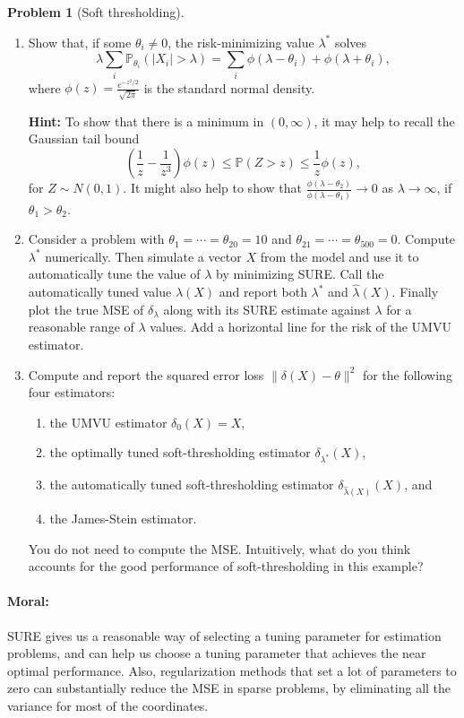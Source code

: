 \documentclass{article}
\newcommand{\PP}{\mathbb{P}}
\theoremstyle{definition}
\newtheorem{problem}{Problem}
\begin{document}
\begin{problem}[Soft thresholding]
\begin{enumerate}[label=(\alph*)]
\item Show that, if some $\theta_i \neq 0$, the risk-minimizing value $\lambda^*$ solves
\[
\lambda \sum_i \PP_{\theta_i}(|X_i| > \lambda) = \sum_i \phi(\lambda - \theta_i) + \phi(\lambda + \theta_i),
\]
where $\phi(z) = \frac{e^{-z^2/2}}{\sqrt{2\pi}}$ is the standard normal density.

{\bf Hint:} To show that there is a minimum in $(0,\infty)$, it may help to recall the Gaussian tail bound
\[
\left(\frac{1}{z} - \frac{1}{z^3}\right) \phi(z) \leq \PP(Z > z) \leq \frac{1}{z}\phi(z),
\]
for $Z \sim N(0,1)$. It might also help to show that $\frac{\phi(\lambda-\theta_2)}{\phi(\lambda-\theta_1)} \to 0$ as $\lambda\to\infty$, if $\theta_1>\theta_2$.



\item Consider a problem with $\theta_1 = \cdots = \theta_{20} = 10$ and $\theta_{21} = \cdots = \theta_{500} = 0$. Compute $\lambda^*$ numerically. Then simulate a vector $X$ from the model and use it to automatically tune the value of $\lambda$ by minimizing SURE. Call the automatically tuned value $\hat\lambda(X)$ and report both $\lambda^*$ and $\hat\lambda(X)$. Finally plot the true MSE of $\delta_\lambda$ along with its SURE estimate against $\lambda$ for a reasonable range of $\lambda$ values. Add a horizontal line for the risk of the UMVU estimator.

  

\item Compute and report the squared error loss $\|\delta(X) - \theta\|^2$ for the following four estimators:
\begin{enumerate}[label=(\roman*)]
\item the UMVU estimator $\delta_0(X) = X$,
\item the optimally tuned soft-thresholding estimator $\delta_{\lambda^*}(X)$,
\item the automatically tuned soft-thresholding estimator $\delta_{\hat{\lambda}(X)}(X)$, and
\item the James-Stein estimator.
\end{enumerate}

You do not need to compute the MSE. Intuitively, what do you think accounts for the good performance of soft-thresholding in this example?



\end{enumerate}

\paragraph{Moral:} SURE gives us a reasonable way of selecting a tuning parameter for estimation problems, and can help us choose a tuning parameter that achieves the near optimal performance. Also, regularization methods that set a lot of parameters to zero can substantially reduce the MSE in sparse problems, by eliminating all the variance for most of the coordinates.
\end{problem}
\end{document}

